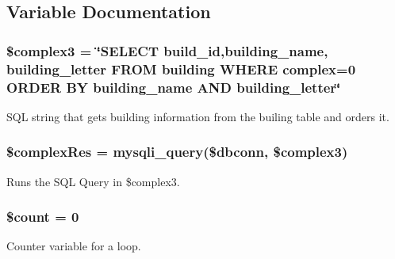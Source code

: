 \subsection{\-Variable \-Documentation}
\hypertarget{editRooms_8php_a6f8a1bc2bbda3a3b8f381cc7b0b5f2fb}{
\subsubsection[{\$complex3}]{\setlength{\rightskip}{0pt plus 5cm}\$complex3 = \char`\"{}\-S\-E\-L\-E\-C\-T build\-\_\-id,building\-\_\-name, building\-\_\-letter \-F\-R\-O\-M building \-W\-H\-E\-R\-E complex=0 \-O\-R\-D\-E\-R \-B\-Y building\-\_\-name \-A\-N\-D building\-\_\-letter\char`\"{}}}\label{editRooms_8php_a6f8a1bc2bbda3a3b8f381cc7b0b5f2fb}
\-S\-Q\-L string that gets building information from the builing table and orders it. \hypertarget{editRooms_8php_a8e5989179b69fda571d827939d1933d4}{
\subsubsection[{\$complex\-Res}]{\setlength{\rightskip}{0pt plus 5cm}\$complex\-Res = mysqli\-\_\-query(\$dbconn, \$complex3)}}\label{editRooms_8php_a8e5989179b69fda571d827939d1933d4}
\-Runs the \-S\-Q\-L \-Query in \$complex3. \hypertarget{editRooms_8php_af789423037bbc89dc7c850e761177570}{
\subsubsection[{\$count}]{\setlength{\rightskip}{0pt plus 5cm}\$count = 0}}\label{editRooms_8php_af789423037bbc89dc7c850e761177570}
\-Counter variable for a loop. 